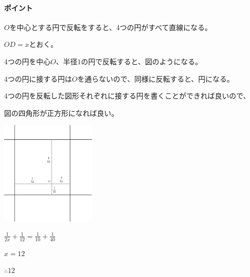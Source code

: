 \documentclass[uplatex,dvipdfmx]{jsbook}
\begin{document}
\paragraph{ポイント}$O$を中心とする円で反転をすると、4つの円がすべて直線になる。

\begin{answer}
    $OD=x$とおく。

    4つの円を中心$O$、半径$1$の円で反転すると、図のようになる。

    4つの円に接する円は$O$を通らないので、同様に反転すると、円になる。

    4つの円を反転した図形それぞれに接する円を書くことができれば良いので、

    図の四角形が正方形になれば良い。

    \includegraphics[clip,height=5cm]{figures/practice4_ans.pdf}

    $\frac{1}{2x}+\frac{1}{12}=\frac{1}{10}+\frac{1}{40}$

    $x=12$

    $\therefore 12$
\end{answer}

\end{document}
